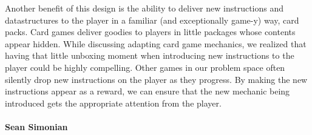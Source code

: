 Another benefit of this design is the ability to deliver new instructions and datastructures
to the player in a familiar (and exceptionally game-y) way, card packs. Card games deliver
goodies to players in little packages whose contents appear hidden. While discussing adapting
card game mechanics, we realized that having that little unboxing moment when introducing new
instructions to the player could be highly compelling. Other games in our problem space often
silently drop new instructions on the player as they progress. By making the new instructions
appear as a reward, we can ensure that the new mechanic being introduced gets the appropriate
attention from the player.

\paragraph{Sean Simonian}
